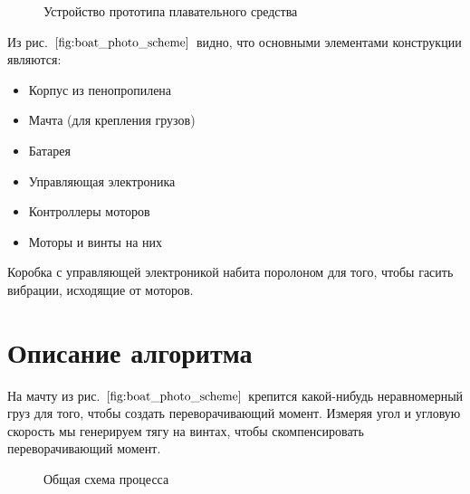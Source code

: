 \documentclass[12pt,a4paper]{article}
\begin{document}
\begin{figure}[h!]
	\caption{Устройство прототипа плавательного средства}
	\label{fig:boat_photo_scheme}
\end{figure}

Из рис. $\ref{fig:boat_photo_scheme}$ видно, что основными элементами конструкции являются:
\begin{itemize}
	\item Корпус из пенопропилена
	\item Мачта (для крепления грузов)
	\item Батарея
	\item Управляющая электроника
	\item Контроллеры моторов
	\item Моторы и винты на них
\end{itemize}

Коробка с управляющей электроникой набита поролоном для того, чтобы гасить вибрации, исходящие от моторов.



\section{Описание алгоритма}

На мачту из рис. $\ref{fig:boat_photo_scheme}$ крепится какой-нибудь неравномерный груз для того, чтобы создать переворачивающий момент. Измеряя угол и угловую скорость мы генерируем тягу на винтах, чтобы скомпенсировать переворачивающий момент.

\begin{figure}[h!]
	\caption{Общая схема процесса}
	\label{fig:general_scheme}
\end{figure}
\end{document}
